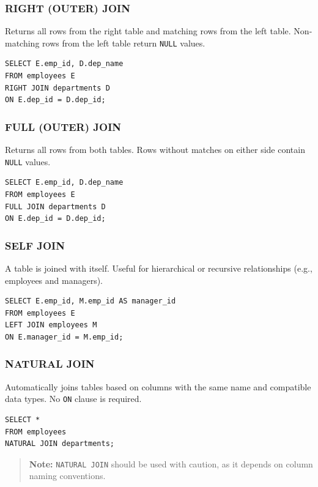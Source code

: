 \documentclass{article}
\begin{document}
\subsubsection{RIGHT (OUTER) JOIN}

Returns all rows from the right table and matching rows from the left table.  
Non-matching rows from the left table return \texttt{NULL} values.

\begin{verbatim}
SELECT E.emp_id, D.dep_name
FROM employees E
RIGHT JOIN departments D
ON E.dep_id = D.dep_id;
\end{verbatim}

\subsubsection{FULL (OUTER) JOIN}

Returns all rows from both tables.  
Rows without matches on either side contain \texttt{NULL} values.

\begin{verbatim}
SELECT E.emp_id, D.dep_name
FROM employees E
FULL JOIN departments D
ON E.dep_id = D.dep_id;
\end{verbatim}

\subsubsection{SELF JOIN}

A table is joined with itself.  
Useful for hierarchical or recursive relationships (e.g., employees and managers).

\begin{verbatim}
SELECT E.emp_id, M.emp_id AS manager_id
FROM employees E
LEFT JOIN employees M
ON E.manager_id = M.emp_id;
\end{verbatim}

\subsubsection{NATURAL JOIN}

Automatically joins tables based on columns with the same name and compatible data types.  
No \texttt{ON} clause is required.

\begin{verbatim}
SELECT *
FROM employees
NATURAL JOIN departments;
\end{verbatim}
\begin{quote}
\textbf{Note:} \texttt{NATURAL JOIN} should be used with caution, as it depends on column naming conventions.
\end{quote}
\end{document}
